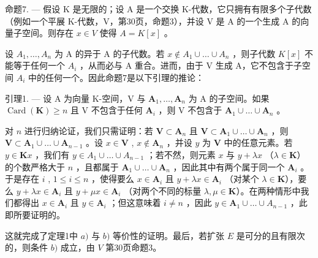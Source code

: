 命题7. --- 假设 K 是无限的；设 A 是一个交换 K-代数，它只拥有有限多个子代数（例如一个平展 K-代数，V，第30页，命题3），并设 V 是 A 的一个生成 A 的向量子空间。则存在 \(x \in V\) 使得 \(A = K[x]\) 。

设 \(A_{1}, \ldots, A_{n}\) 为 A 的异于 A 的子代数。若 \(x \notin A_{1} \cup \ldots \cup A_{n}\) ，则子代数 \(K[x]\) 不能等于任何一个 \(A_{i}\) ，从而必与 A 重合。进而，由于 V 生成 A，它不包含于子空间 \(A_{i}\) 中的任何一个。因此命题7是以下引理的推论：

引理1. --- 设 A 为向量 K-空间，V 与 \(\mathbf{A}_1, \ldots, \mathbf{A}_n\) 为 A 的子空间。如果 \(\operatorname{Card}(\mathbf{K}) \geqslant n\) 且 V 不包含于任何 \(\mathbf{A}_i\) ，则 V 不包含于 \(\mathbf{A}_1 \cup \ldots \cup \mathbf{A}_n\) 。

对 \(n\) 进行归纳论证，我们只需证明：若 \(\mathbf{V} \subset \mathbf{A}_n\) 且 \(\mathbf{V} \subset \mathbf{A}_1 \cup \ldots \cup \mathbf{A}_n\) ，则 \(\mathbf{V} \subset \mathbf{A}_1 \cup \ldots \cup \mathbf{A}_{n-1}\) 。设 \(x \in \mathbf{V}\) , \(x \notin \mathbf{A}_n\) ，并设 \(y\) 为 \(\mathbf{V}\) 中的任意元素。若 \(y \in \mathbf{K}x\) ，我们有 \(y \in A_1 \cup \ldots \cup A_{n-1}\) ；若不然，则元素 \(x\) 与 \(y + \lambda x\) （\(\lambda \in \mathbf{K}\)）的个数严格大于 \(n\) ，且都属于 \(\mathbf{A}_1 \cup \ldots \cup \mathbf{A}_n\) ，因此其中有两个属于同一个 \(\mathbf{A}_i\) 。于是存在 \(i\) , \(1 \leqslant i \leqslant n\) ，使得要么 \(x \in \mathbf{A}_i\) 且 \(y + \lambda x \in \mathbf{A}_i\) （对某个 \(\lambda \in \mathbf{K}\)），要么 \(y + \lambda x \in \mathbf{A}_i\) 且 \(y + \mu x \in \mathbf{A}_i\) （对两个不同的标量 \(\lambda, \mu \in \mathbf{K}\)）。在两种情形中我们都得出 \(x \in \mathbf{A}_i\) 且 \(y \in \mathbf{A}_i\) ；但这意味着 \(i \neq n\) ，因此 \(y \in \mathbf{A}_1 \cup \ldots \cup A_{n-1}\) ，此即所要证明的。

这就完成了定理1中 \(a)\) 与 \(b)\) 等价性的证明。最后，若扩张 \(E\) 是可分的且有限次的，则条件 \(b)\) 成立，由 \(V\) 第30页命题3。

